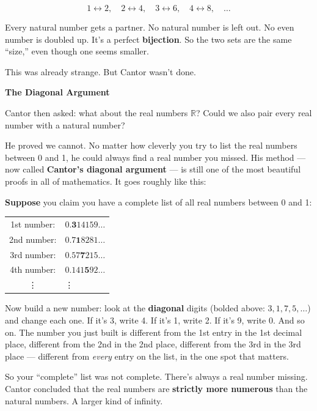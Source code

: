 \documentclass[12pt]{article}
\begin{document}
\[
  1 \leftrightarrow 2,\quad
  2 \leftrightarrow 4,\quad
  3 \leftrightarrow 6,\quad
  4 \leftrightarrow 8,\quad \ldots
\]

Every natural number gets a partner. No natural number is left out. No even number
is doubled up. It's a perfect \textbf{bijection}. So the two sets are the same ``size,''
even though one seems smaller.

This was already strange. But Cantor wasn't done.

\bigskip
\noindent\textbf{The Diagonal Argument}

Cantor then asked: what about the real numbers $\mathbb{R}$? Could we also pair
every real number with a natural number?

He proved we cannot. No matter how cleverly you try to list the real numbers between
0 and 1, he could always find a real number you missed. His method --- now called
\textbf{Cantor's diagonal argument} --- is still one of the most beautiful proofs
in all of mathematics. It goes roughly like this:

\textbf{Suppose} you claim you have a complete list of all real numbers between 0 and 1:

\medskip
\begin{center}
\begin{tabular}{@{} c l @{}}
  1st number: & $0.\mathbf{3}14159\ldots$ \\
  2nd number: & $0.7\mathbf{1}8281\ldots$ \\
  3rd number: & $0.57\mathbf{7}215\ldots$ \\
  4th number: & $0.141\mathbf{5}92\ldots$ \\
  \vdots & \vdots
\end{tabular}
\end{center}

\medskip
Now build a new number: look at the \textbf{diagonal} digits (bolded above:
$3, 1, 7, 5, \ldots$) and change each one. If it's 3, write 4. If it's 1, write 2. If it's 9, write 0.
And so on. The number you just built is different from the 1st entry in the 1st decimal place,
different from the 2nd in the 2nd place, different from the 3rd in the 3rd place
--- different from \textit{every} entry on the list, in the one spot that matters.

So your ``complete'' list was not complete. There's always a real number missing.
Cantor concluded that the real numbers are \textbf{strictly more numerous}
than the natural numbers. A larger kind of infinity.
\end{document}
